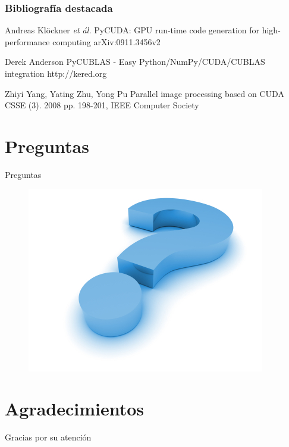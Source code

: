 \documentclass{beamer}
\begin{document}
\begin{frame}[allowframebreaks]
  \frametitle{Bibliografía destacada}
    
  \begin{thebibliography}{3}
    
  \beamertemplatearticlebibitems

   
    Andreas Kl{\"o}ckner \emph{et ál.}
    \newblock PyCUDA: GPU run-time code generation for high-performance computing
    \newblock arXiv:0911.3456v2

    Derek Anderson
    \newblock PyCUBLAS - Easy Python/NumPy/CUDA/CUBLAS integration
    \newblock http://kered.org

    Zhiyi Yang, Yating Zhu, Yong Pu
    \newblock Parallel image processing based on CUDA
    \newblock CSSE (3). 2008 pp. 198-201, IEEE Computer Society
  \end{thebibliography}
\end{frame}


\section*{Preguntas}

\begin{frame}{Preguntas}
  \begin{figure}
    \begin{center}
      \includegraphics[width=.5\textwidth]{question.jpg}
    \end{center}
  \end{figure}
\end{frame}

\section*{Agradecimientos}

\begin{frame}
  \begin{center}
    {\Huge Gracias por su atención}
  \end{center}
\end{frame}
\end{document}
